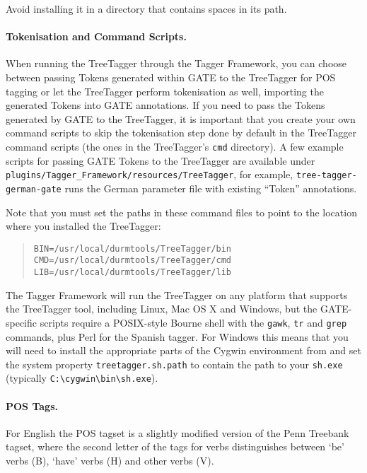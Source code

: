 
Avoid installing it in a directory that contains spaces in its path.

\paragraph{Tokenisation and Command Scripts.} 
When running the TreeTagger through the Tagger Framework, you can
choose between passing Tokens generated within GATE to the TreeTagger
for POS tagging or let the TreeTagger perform tokenisation as well,
importing the generated Tokens into GATE annotations. If you need to
pass the Tokens generated by GATE to the TreeTagger, it is important
that you create your own command scripts to skip the tokenisation step
done by default in the TreeTagger command scripts (the ones in the
TreeTagger's \verb|cmd| directory). A few example scripts for passing
GATE Tokens to the TreeTagger are available under
\verb|plugins/Tagger_Framework/resources/TreeTagger|, for example,
\verb|tree-tagger-german-gate| runs the German parameter file with
existing ``Token'' annotations.

Note that you must set the paths in these command files to point to
the location where you installed the TreeTagger:
\begin{quote}
 \begin{small}
 \begin{verbatim}
BIN=/usr/local/durmtools/TreeTagger/bin
CMD=/usr/local/durmtools/TreeTagger/cmd
LIB=/usr/local/durmtools/TreeTagger/lib
\end{verbatim}
\end{small}
\end{quote}
The Tagger Framework will run the TreeTagger on any platform that
supports the TreeTagger tool, including Linux, Mac OS X and Windows,
but the GATE-specific scripts require a POSIX-style Bourne shell with
the \texttt{gawk}, \texttt{tr} and \texttt{grep} commands, plus Perl
for the Spanish tagger.  For Windows this means that you will need to
install the appropriate parts of the Cygwin environment from
 and set the system property
\texttt{treetagger.sh.path} to contain the path to your
\texttt{sh.exe} (typically \verb|C:\cygwin\bin\sh.exe|).

\paragraph{POS Tags.}
For English the POS tagset is a slightly modified version of the Penn Treebank
tagset, where the second letter of the tags for verbs distinguishes between `be'
verbs (B), `have' verbs (H) and other verbs (V).

